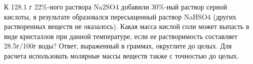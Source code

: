 
К 128.1 г 22$\%$-ного раствора Na2SO4 добавили 30$\%$-ный
раствор серной кислоты, в результате образовался пересыщенный раствор NaHSO4 (других
растворенных веществ не оказалось). Какая масса кислой соли может выпасть в
виде кристаллов при данной температуре, если ее растворимость составляет
28.5г/100г воды? Ответ, выраженный в граммах, округлите до целых. Для расчета
использовать молярные массы веществ также с точностью до целых.




